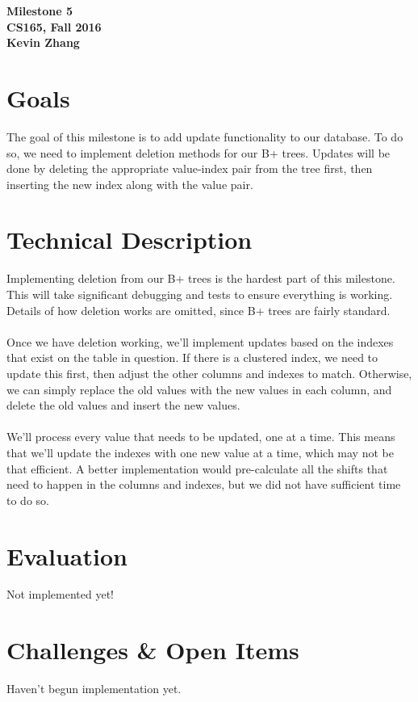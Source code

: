 \documentclass[12pt]{article}
\begin{document}
\begin{center}
\textbf{Milestone 5 \\ CS165, Fall 2016 \\ Kevin Zhang}
\end{center}

\section{Goals}
The goal of this milestone is to add update functionality to our database.  To do so, we need to implement deletion methods for our B+ trees.  Updates will be done by deleting the appropriate value-index pair from the tree first, then inserting the new index along with the value pair.  

\section{Technical Description}
Implementing deletion from our B+ trees is the hardest part of this milestone.  This will take significant debugging and tests to ensure everything is working.  Details of how deletion works are omitted, since B+ trees are fairly standard.
\\\\Once we have deletion working, we'll implement updates based on the indexes that exist on the table in question.  If there is a clustered index, we need to update this first, then adjust the other columns and indexes to match.  Otherwise, we can simply replace the old values with the new values in each column, and delete the old values and insert the new values.
\\\\We'll process every value that needs to be updated, one at a time.  This means that we'll update the indexes with one new value at a time, which may not be that efficient.  A better implementation would pre-calculate all the shifts that need to happen in the columns and indexes, but we did not have sufficient time to do so.

\section{Evaluation}
Not implemented yet!

\section{Challenges \& Open Items}
Haven't begun implementation yet.
\end{document}
